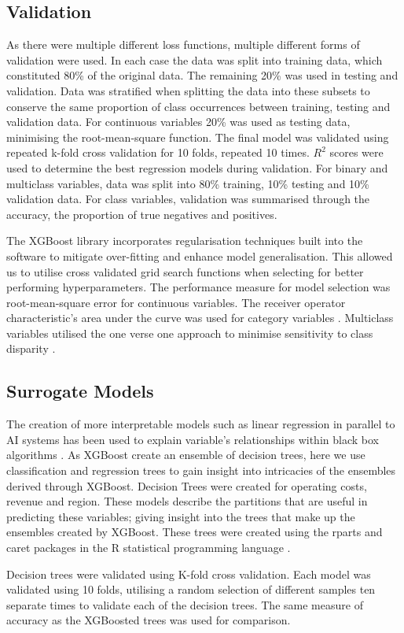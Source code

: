 \documentclass[review,12pt,authoryear]{elsarticle}
\begin{document}
\begin{linenumbers}
\subsection{Validation}
As there were multiple different loss functions, multiple different forms of validation were used. In each case the data was split into training data, which constituted 80\% of the original data. The remaining 20\% was used in testing and validation. Data was stratified when splitting the data into these subsets to conserve the same proportion of class occurrences between training, testing and validation data. For continuous variables 20\% was used as testing data, minimising the root-mean-square function. The final model was validated using repeated k-fold cross validation for 10 folds, repeated 10 times. $R^2$ scores were used to determine the best regression models during validation.
For binary and multiclass variables, data was split into 80\% training, 10\% testing and 10\% validation data. For class variables, validation was summarised through the accuracy, the proportion of true negatives and positives.
\par
The XGBoost library incorporates regularisation techniques built into the software to mitigate over-fitting and enhance model generalisation. This allowed us to utilise cross validated grid search functions when selecting for better performing hyperparameters. The performance measure for model selection was root-mean-square error for continuous variables. The receiver operator characteristic's area under the curve was used for category variables \citep{hanley1982meaning}. Multiclass variables utilised the one verse one approach to minimise sensitivity to class disparity \citep{ferriExperimentalComparisonPerformance2009,handSimpleGeneralisationArea2001}.

\subsection{Surrogate Models}

The creation of more interpretable models such as linear regression in parallel to AI systems has been used to explain variable's relationships within black box algorithms \citep{molnarInterpretableMachineLearning2022}. As XGBoost create an ensemble of decision trees, here we use classification and regression trees to gain insight into intricacies of the ensembles derived through XGBoost. Decision Trees were created for operating costs, revenue and region. These models describe the partitions that are useful in predicting these variables; giving insight into the trees that make up the ensembles created by XGBoost. These trees were created using the rparts and caret packages \citep{kuhnBuildingPredictiveModels2008,terrytherneauRpartRecursivePartitioning2022} in the R statistical programming language \citep{rcoreteamLanguageEnvironmentStatistical2021}.
\par
Decision trees were validated using K-fold cross validation. Each model was validated using 10 folds, utilising a random selection of different samples ten separate times to validate each of the decision trees. The same measure of accuracy as the XGBoosted trees was used for comparison.

\end{linenumbers}
\end{document}
